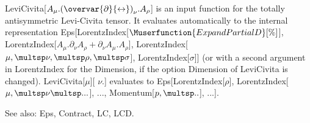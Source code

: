 LeviCivita[\({A_{\mu }}.{{\left( \overvar{\partial }{\leftrightarrow } \right) }_{\nu }}.{A_{\rho }}\)] is an input function for the totally antisymmetric
Levi-Civita tensor. It evaluates automatically to the internal representation
  Eps[LorentzIndex[\(\Muserfunction{ExpandPartialD}[\%]\)], LorentzIndex[\({A_{\mu }}.{{\partial }_{\nu }}A_{\rho }^{ }+{{\partial }_{\nu }}A_{\mu
}^{ }.{A_{\rho }}\)], LorentzIndex[\(\mu ,\multsp \nu ,\multsp \rho ,\multsp \sigma \)], LorentzIndex[\(\sigma \)]] (or with a second argument
in LorentzIndex for the Dimension, if the option Dimension of LeviCivita is
  changed). LeviCivita[\(\mu \)][ \(\nu \).] evaluates to Eps[LorentzIndex[\(\rho \)], LorentzIndex[\(\mu ,\multsp \nu \multsp ...\)], ..., Momentum[\(p,\multsp
..\)], ...].


See also:  Eps, Contract, LC, LCD.





\dispSFoutmath{
{{\epsilon }^{\alpha \beta \gamma \delta }}
}











